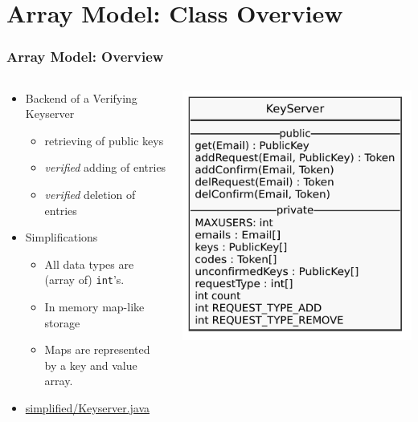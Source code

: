 \documentclass{beamer}
\begin{document}
\section{Array Model: Class Overview}
\begin{frame}
    \frametitle{Array Model: Overview}
    \begin{columns}
      \begin{column}{.7\textwidth}
        \begin{itemize}
          \item Backend of a Verifying Keyserver
          \begin{itemize}
            \item retrieving of public keys
            \item \emph{verified} adding of entries
            \item \emph{verified} deletion of entries
          \end{itemize}
          \item Simplifications
          \begin{itemize}
            \item All data types are (array of) \texttt{int}'s.
            \item In memory map-like storage
            \item Maps are represented \\by a key and value array.
          \end{itemize}
          \item \href{https://github.com/KeYProject/verifythis-ltc-2020/blob/master/simplified/Keyserver.java}%
          {simplified/Keyserver.java}
        \end{itemize}
      \end{column}
      \begin{column}{.45\textwidth}
        \includegraphics[width=\textwidth]{simplified_uml.pdf}

\end{column}
\end{columns}
\end{frame}
\end{document}
